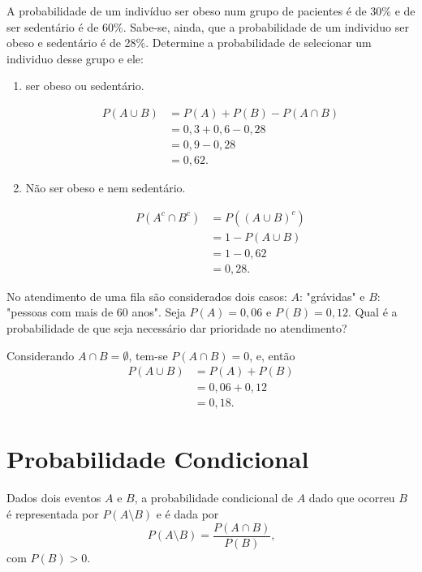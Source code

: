\documentclass[11pt,fleqn]{book}
\numberwithin{mpicture}{chapter}
\numberwithin{mtable}{chapter}
\numberwithin{mframe}{chapter}
\begin{document}
\begin{example}
	A probabilidade de um indivíduo ser obeso num grupo de pacientes é de 30\% e de ser sedentário é de 60\%. Sabe-se, ainda, que a probabilidade de um individuo ser obeso e sedentário é de 28\%. Determine a probabilidade de selecionar um individuo desse grupo e ele:
	
	\begin{enumerate}[label=\alph*)]
		\item ser obeso ou sedentário.
		
			\begin{align*}
				P(A\cup B)&=P(A)+P(B)-P(A\cap B)\\
						  &=0,3+0,6-0,28\\
						  &=0,9-0,28\\
						  &=0,62\text{.}
			\end{align*}
			
		\item Não ser obeso e nem sedentário.
		
			\begin{align*}
				P(A^c\cap B^c)&=P((A\cup B)^c)\\
							  &=1-P(A\cup B)\\
							  &=1-0,62\\
							  &=0,28\text{.}
			\end{align*}
	\end{enumerate}
\end{example}

\begin{example}
	No atendimento de uma fila são considerados dois casos: $A$: "grávidas" e $B$: "pessoas com mais de 60 anos". Seja $P(A)=0,06$ e $P(B)=0,12$. Qual é a probabilidade de que seja necessário dar prioridade no atendimento?
	
	Considerando $A\cap B=\emptyset$, tem-se $P(A\cap B)=0$, e, então
	\begin{align*}
		P(A\cup B)&=P(A)+P(B)\\
				  &=0,06+0,12\\
				  &=0,18\text{.}
	\end{align*}
\end{example}

\section{Probabilidade Condicional}

Dados dois eventos $A$ e $B$, a probabilidade condicional de $A$ dado que ocorreu $B$ é representada por $P(A\setminus B)$ e é dada por
\begin{equation}
	P(A\setminus B)=\frac{P(A\cap B)}{P(B)}\text{,}
\end{equation}
com $P(B)>0$.
\end{document}
